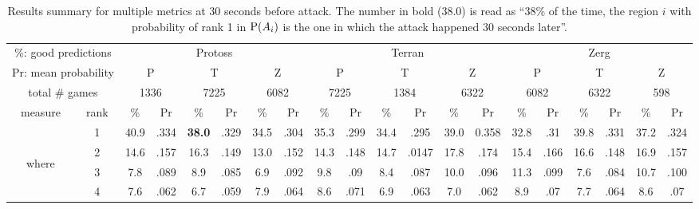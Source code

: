 \setlength{\tabcolsep}{4.69pt}
\begin{table}
\caption{Results summary for multiple metrics at 30 seconds before attack. The number in bold (38.0) is read as ``38\% of the time, the region $i$ with probability of rank 1 in $\mathrm{P}(A_i)$ is the one in which the attack happened 30 seconds later''.}
\begin{center}
\begin{footnotesize}
\begin{tabular}{|cc|cc|cc|cc|cc|cc|cc|cc|cc|cc|}
\hline
\multicolumn{2}{|c|}{\%: good predictions} & \multicolumn{6}{||c|}{Protoss} & \multicolumn{6}{|c|}{Terran} & \multicolumn{6}{|c|}{Zerg} \\
\multicolumn{2}{|c|}{Pr: mean probability} & \multicolumn{2}{||c|}{P} & \multicolumn{2}{|c|}{T} & \multicolumn{2}{|c|}{Z} & \multicolumn{2}{|c|}{P} & \multicolumn{2}{|c|}{T} & \multicolumn{2}{|c|}{Z} & \multicolumn{2}{|c|}{P} & \multicolumn{2}{|c|}{T} & \multicolumn{2}{|c|}{Z} \\
\hline
\multicolumn{2}{|c|}{total \# games} & \multicolumn{2}{|c|}{1336} & \multicolumn{2}{|c|}{7225}& \multicolumn{2}{|c|}{6082}& \multicolumn{2}{|c|}{7225}& \multicolumn{2}{|c|}{1384}& \multicolumn{2}{|c|}{6322}& \multicolumn{2}{|c|}{6082}& \multicolumn{2}{|c|}{6322}& \multicolumn{2}{|c|}{598}\\
\hline
measure & rank & \% & Pr & \% & Pr & \% & Pr & \% & Pr & \% & Pr& \% & Pr& \% & Pr& \% & Pr& \% & Pr  \\
\hline
 & 1 & 40.9 & .334 & \textbf{38.0} & .329 & 34.5 & .304 & 35.3 & .299 & 34.4 & .295 & 39.0 & 0.358 & 32.8 & .31 & 39.8 & .331 & 37.2 & .324 \\
\multirow{3}{3mm}{\begin{sideways}\parbox{3mm}{\begin{small}where\end{small}}\end{sideways}}
 & 2 & 14.6 & .157 & 16.3 & .149 & 13.0 & .152 & 14.3 & .148 & 14.7 & .0147 & 17.8 & .174 & 15.4 & .166 & 16.6 & .148 & 16.9 & .157 \\
 & 3 & 7.8 & .089 & 8.9 & .085 & 6.9 & .092 & 9.8 & .09 & 8.4 & .087 & 10.0 & .096 & 11.3 & .099 & 7.6 & .084 & 10.7 & .100 \\
 & 4 & 7.6 & .062 & 6.7 & .059 & 7.9 & .064 & 8.6 & .071 & 6.9 & .063 & 7.0 & .062 & 8.9 & .07 & 7.7 & .064 & 8.6 & .07 \\

\end{tabular}
\end{footnotesize}
\end{center}
\end{table}
